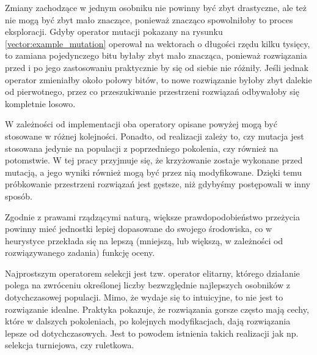 \documentclass[./FM_mgr.tex]{subfiles}
\begin{document}
Zmiany zachodzące w jednym osobniku nie powinny być zbyt drastyczne, ale też nie mogą być zbyt mało znaczące, ponieważ znacząco spowolniłoby to proces eksploracji.
Gdyby operator mutacji pokazany na rysunku \ref{vector:example_mutation} operował na wektorach o długości rzędu kilku tysięcy, to zamiana pojedynczego bitu byłaby zbyt mało znacząca, ponieważ rozwiązania przed i po jego zastosowaniu praktycznie by się od siebie nie różniły.
Jeśli jednak operator zmieniałby około połowy bitów, to nowe rozwiązanie byłoby zbyt dalekie od pierwotnego, przez co przeszukiwanie przestrzeni rozwiązań odbywałoby się kompletnie losowo.

W zależności od implementacji oba operatory opisane powyżej mogą być stosowane w różnej kolejności.
Ponadto, od realizacji zależy to, czy mutacja jest stosowana jedynie na populacji z poprzedniego pokolenia, czy również na potomstwie.
W tej pracy przyjmuje się, że krzyżowanie zostaje wykonane przed mutacją, a jego wyniki również mogą być przez nią modyfikowane.
Dzięki temu próbkowanie przestrzeni rozwiązań jest gęstsze, niż gdybyśmy postępowali w inny sposób.

Zgodnie z prawami rządzącymi naturą, większe prawdopodobieństwo przeżycia powinny mieć jednostki lepiej dopasowane do swojego środowiska, co w heurystyce przekłada się na lepszą (mniejszą, lub większą, w zależności od rozwiązywanego zadania) funkcję oceny.

Najprostszym operatorem selekcji jest tzw. operator elitarny, którego działanie polega na zwróceniu określonej liczby bezwzględnie najlepszych osobników z dotychczasowej populacji.
Mimo, że wydaje się to intuicyjne, to nie jest to rozwiązanie idealne.
Praktyka pokazuje, że rozwiązania gorsze często mają cechy, które w dalszych pokoleniach, po kolejnych modyfikacjach, dają rozwiązania lepsze od dotychczasowych.
Jest to powodem istnienia takich realizacji jak np. selekcja turniejowa, czy ruletkowa.
\end{document}
